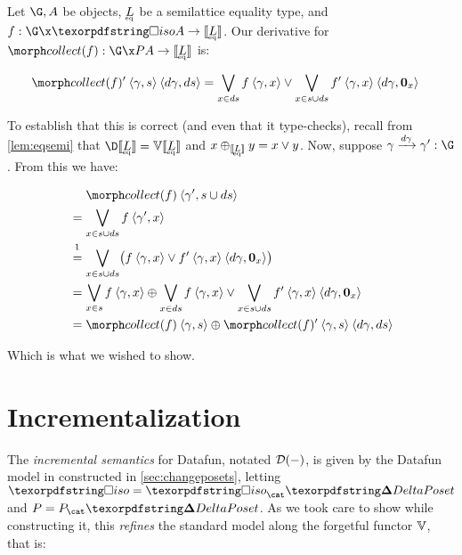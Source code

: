 \documentclass{rntz}\usepackage{fantasy}%
\begin{document}
Let $\G, A$ be objects, $\eqt L$ be a semilattice equality type, and $f : \G \x
\isof A \to \den{\eqt L}$. Our derivative for $\pcollect f : \G \x \pfinof A \to
\den{\eqt L}$ is:

\nopagebreak[2]
\begin{align*}
  \deriv{\pcollect f} \<\tuple{\gamma,s} \<\tuple{d\gamma,\ds}
  &= \bigvee_{x \in \ds} f\<\tuple{\gamma,x} \vee
  \bigvee_{x \in s \cup \ds} \deriv f \<\tuple{\gamma,x} \<\tuple{d\gamma, \zero_x}
\end{align*}

\noindent To establish that this is correct (and even that it type-checks),
recall from \cref{lem:eqsemi} that $\chgs{\den{\eqt L}} = \vals{\den{\eqt L}}$
and $x \upd_{\den{\eqt L}} y = x \vee y$. Now, suppose $\longvld{d\gamma}{\gamma}{\gamma'} :
\G$. From this we have:

\nopagebreak[2]
\begin{align*}
  &\phantom{{}={}}\pcollect{f} \<\tuple{\gamma', s \cup \ds}
  \\
  &= \bigvee_{x \in s \cup \ds} f \<\tuple{\gamma', x}
  \\
  &\overset{\footnotemark}{=} \bigvee_{x \in s \cup \ds} \bigl(f \<\tuple{\gamma,x}
  \vee \deriv f \<\tuple{\gamma,x} \<\tuple{d\gamma,\zero_x}\bigr)
  \\
  &= \bigvee_{x \in s} f\<\tuple{\gamma,x}
  \upd \bigvee_{x \in \ds} f\<\tuple{\gamma,x}
  \vee \bigvee_{x \in s \cup \ds} \deriv f \<\tuple{\gamma,x} \<\tuple{d\gamma,\zero_x}
  \\
  &= \pcollect f \<\tuple{\gamma,s}
  \upd \deriv{\pcollect f} \<\tuple{\gamma,s} \<\tuple{d\gamma,\ds}
\end{align*}

\nopagebreak%
\noindent
Which is what we wished to show.


\section{Incrementalization}
\label{sec:incremental}

The \emph{incremental semantics} for Datafun, notated $\mathcal{D}({-})$, is given
by the Datafun model in \CP{} constructed in \cref{sec:changeposets}, letting
$\disco = \iso_\CP$ and $\pfin = \pfin_\CP$. As we took care to show while
constructing it, this \emph{refines} the standard model along the forgetful
functor $\mathbb{V}$, that is:
\end{document}
